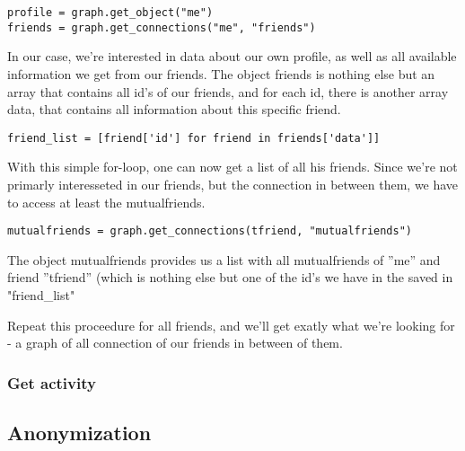 \documentclass[11pt]{article} %
\begin{document}
\begin{lstlisting} 
profile = graph.get_object("me")
friends = graph.get_connections("me", "friends")
\end{lstlisting}

In our case, we're interested in data about our own profile, as well as all available information we get from our friends.
The object friends is nothing else but an array that contains all id's of our friends, and for each id, there is another array data, that contains all information about this specific friend.  

\begin{lstlisting}
friend_list = [friend['id'] for friend in friends['data']]
\end{lstlisting}

With this simple for-loop, one can now get a list of all his friends. Since we're not primarly interesseted in our friends, but the connection in between them, we have to access at least the mutualfriends. 

\begin{lstlisting}
mutualfriends = graph.get_connections(tfriend, "mutualfriends")
\end{lstlisting}

The object mutualfriends provides us a list with all mutualfriends of ''me'' and friend ''tfriend'' (which is nothing else but one of the id's we have in the saved in "friend\_list"

Repeat this proceedure for all friends, and we'll get exatly what we're looking for - a graph of all connection of our friends in between of them.

\subsubsection{Get activity}

 

\subsection{Anonymization}
\end{document}
